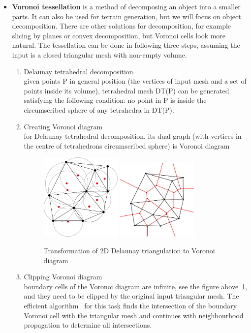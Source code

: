 \begin{itemize}
\item \textbf{Voronoi tessellation} is a method of decomposing an object into a smaller parts. It can also be used for terrain generation, but we will focus on object decomposition. There are other solutions for decomposition, for example slicing by planes or convex decomposition, but Voronoi cells look more natural. The tessellation can be done in following three steps, assuming the input is a closed triangular mesh with non-empty volume.
\begin{enumerate}
    \item Delaunay tetrahedral decomposition \\ given points P in general position (the vertices of input mesh and a set of points inside its volume), tetrahedral mesh DT(P) can be generated satisfying the following condition: no point in P is inside the circumscribed sphere of any tetrahedra in DT(P).
    \item Creating Voronoi diagram \\ for Delaunay tetrahedral decomposition, its dual graph (with vertices in the centre of tetrahedrons circumscribed sphere) is Voronoi diagram
    \begin{figure}[ht!]
        \centering
        \includegraphics[width=0.4\textwidth]{img/delaunay}
        \includegraphics[width=0.4\textwidth]{img/voronoi}
        \caption{Transformation of 2D Delaunay triangulation to Voronoi diagram}
        \label{DT}
    \end{figure}
    \item Clipping Voronoi diagram \\ boundary cells of the Voronoi diagram are infinite, see the figure above~\ref{DT}, and they need to be clipped by the original input triangular mesh. The efficient algorithm~\cite{yan2010efficient} for this task finds the intersection of the boundary Voronoi cell with the triangular mesh and continues with neighbourhood propagation to determine all intersections. 
\end{enumerate}


\end{itemize}
